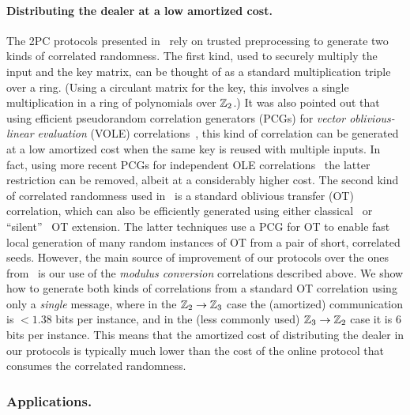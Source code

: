 \paragraph{Distributing the dealer at a low amortized cost.} The 2PC protocols presented in~\cite{boneh2018-darkmatter} rely on trusted preprocessing to generate two kinds of correlated randomness. The first kind, used to securely multiply the input and the key matrix, can be thought of as a standard multiplication triple over a ring. (Using a circulant matrix for the key, this involves a single multiplication in a ring of polynomials over $\mathbb{Z}_2$.)  It was also pointed out that using efficient pseudorandom correlation generators (PCGs) for {\em vector oblivious-linear evaluation} (VOLE) correlations~\cite{BCGI18,BoyleetalCCS19,SchopmanetalCCS19}, this kind of correlation can be generated at a low amortized cost when the same key is reused with multiple inputs. In fact, using more recent PCGs for independent OLE correlations~\cite{PCGRingLPNCrypto20} the latter restriction can be removed, albeit at a considerably higher cost.  The second kind of correlated randomness used in~\cite{boneh2018-darkmatter} is a standard oblivious transfer (OT) correlation, which can also be efficiently generated using either classical~\cite{IKNP} or ``silent''~\cite{PCGCrypto19,BoyleetalCCS19,Ferret} OT extension. The latter techniques use a PCG for OT to enable fast local generation of many random instances of OT from a pair of short, correlated seeds.  
However, the main source of improvement of our protocols over the ones from~\cite{boneh2018-darkmatter}  is our use of the {\em modulus conversion} correlations described above. We show how to generate both kinds of correlations from a standard OT correlation using only a {\em single} message, where in the $\mathbb{Z}_2 \to \mathbb{Z}_3$ case the (amortized) communication is $<1.38$ bits per instance, and in the (less commonly used) $\mathbb{Z}_3 \to \mathbb{Z}_2$ case it is $6$ bits per instance. This means that the amortized cost of distributing the dealer in our protocols is typically much lower than the cost of the online protocol that consumes the correlated randomness.


\subsubsection{Applications.}


